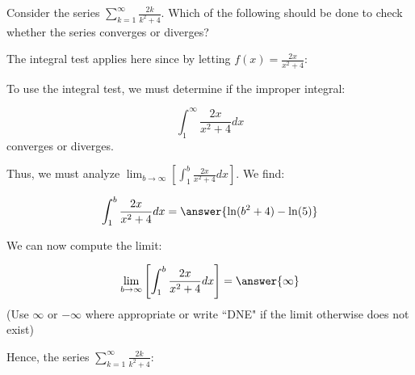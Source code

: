 \documentclass{ximera}
\author{Jim Talamo}
\begin{document}
\begin{exercise}
Consider the series $\sum_{k=1}^{\infty} \frac{2k}{k^2+4}$.  Which of the following should be done to check whether the series converges or diverges?
\begin{multipleChoice}
\end{multipleChoice}

\begin{exercise}
The integral test applies here since by letting $f(x) = \frac{2x}{x^2+4}$:
\begin{selectAll}
\end{selectAll}

To use the integral test, we must determine if the improper integral:

\[
\int_1^{\infty} \frac{2x}{x^2+4} dx
\]
converges or diverges.

Thus, we must analyze $\lim_{b \to \infty} \left[\int_1^b \frac{2x}{x^2+4} dx\right]$.  We find:

\[
\int_1^b \frac{2x}{x^2+4} dx = \answer{\ln(b^2+4) - \ln(5)}
\]

\begin{exercise}
We can now compute the limit:

\[ \lim_{b \to \infty} \left[\int_1^b \frac{2x}{x^2+4} dx\right] = \answer{\infty} \]
(Use $\infty$ or $-\infty$ where appropriate or write ``DNE" if the limit otherwise does not exist)

Hence, the series  $\sum_{k=1}^{\infty} \frac{2k}{k^2+4}$:
\begin{multipleChoice}
\end{multipleChoice}
\end{exercise}
\end{exercise}
\end{exercise}
\end{document}
